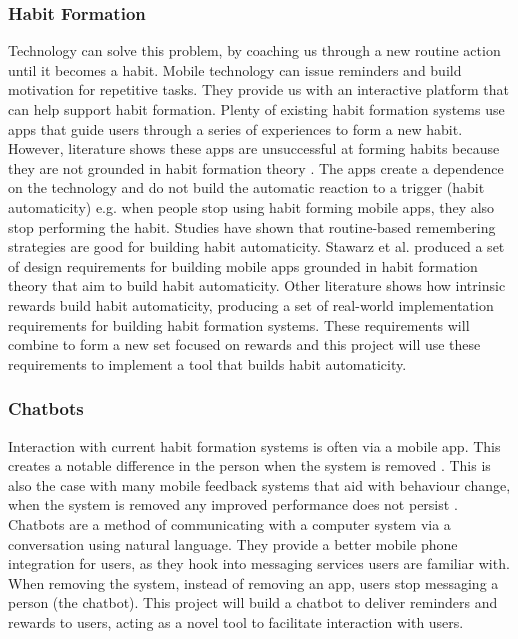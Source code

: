 \subsubsection*{Habit Formation}
Technology can solve this problem, by coaching us through a new routine action until it becomes a habit. Mobile technology can issue reminders and build motivation for repetitive tasks. They provide us with an interactive platform that can help support habit formation. Plenty of existing habit formation systems use apps that guide users through a series of experiences to form a new habit. However, literature shows these apps are unsuccessful at forming habits because they are not grounded in habit formation theory \cite{article_beyond_self_tracking_designing_apps, article_apps_of_steel}. The apps create a dependence on the technology and do not build the automatic reaction to a trigger (habit automaticity) \cite{article_dont_kick_habit} e.g. when people stop using habit forming mobile apps, they also stop performing the habit.\newline
\newline
Studies have shown that routine-based remembering strategies are good for building habit automaticity. Stawarz et al. \cite{article_dont_forget_your_pill} produced a set of design requirements for building mobile apps grounded in habit formation theory that aim to build habit automaticity. Other literature \cite{article_taxonomy_motivational_affordances_meaningful} shows how intrinsic rewards build habit automaticity, producing a set of real-world implementation requirements for building habit formation systems. These requirements will combine to form a new set focused on rewards and this project will use these requirements to implement a tool that builds habit automaticity.

\subsubsection*{Chatbots}
Interaction with current habit formation systems is often via a mobile app. This creates a notable difference in the person when the system is removed \cite{article_my_phone_is_part_of_my_soul}. This is also the case with many mobile feedback systems that aid with behaviour change, when the system is removed any improved performance does not persist \cite{article_dont_kick_habit, article_realtime_feedback_improving_medication_taking}.\newline
\newline
Chatbots are a method of communicating with a computer system via a conversation using natural language. They provide a better mobile phone integration for users, as they hook into messaging services users are familiar with. When removing the system, instead of removing an app, users stop messaging a person (the chatbot). This project will build a chatbot to deliver reminders and rewards to users, acting as a novel tool to facilitate interaction with users.

